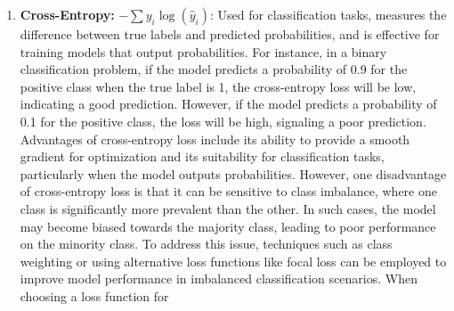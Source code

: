 \documentclass[
  letterpaper,
  DIV=11,
  numbers=noendperiod]{scrreprt}
\begin{document}
\begin{enumerate}
  while its disadvantages include potential challenges in optimization
  due to non-differentiability and slower convergence compared to MSE.
  When choosing between MSE and MAE, it is important to consider the
  specific characteristics of the dataset and the goals of the modeling
  task, as well as the trade-offs between sensitivity to outliers and
  optimization efficiency. There are disadvantages to using MAE, such as
  its non-differentiability at zero, which can lead to challenges in
  optimization using gradient-based methods. This can result in slower
  convergence compared to MSE, especially in cases where the model
  predictions are close to the true values. Additionally, MAE does not
  provide a smooth gradient for optimization, which can make it more
  difficult for certain optimization algorithms to find the optimal
  parameters efficiently. Despite these drawbacks, MAE's robustness to
  outliers can make it a preferable choice in certain regression tasks
  where the presence of outliers is a concern. When choosing between MSE
  and MAE, it is important to consider the specific characteristics of
  the dataset and the goals of the modeling task, as well as the
  trade-offs between sensitivity to outliers and optimization
  efficiency.
\item
  \textbf{Cross-Entropy:} \(-\sum y_i \log(\hat{y}_i)\): Used for
  classification tasks, measures the difference between true labels and
  predicted probabilities, and is effective for training models that
  output probabilities. For instance, in a binary classification
  problem, if the model predicts a probability of 0.9 for the positive
  class when the true label is 1, the cross-entropy loss will be low,
  indicating a good prediction. However, if the model predicts a
  probability of 0.1 for the positive class, the loss will be high,
  signaling a poor prediction. Advantages of cross-entropy loss include
  its ability to provide a smooth gradient for optimization and its
  suitability for classification tasks, particularly when the model
  outputs probabilities. However, one disadvantage of cross-entropy loss
  is that it can be sensitive to class imbalance, where one class is
  significantly more prevalent than the other. In such cases, the model
  may become biased towards the majority class, leading to poor
  performance on the minority class. To address this issue, techniques
  such as class weighting or using alternative loss functions like focal
  loss can be employed to improve model performance in imbalanced
  classification scenarios. When choosing a loss function for

\end{enumerate}
\end{document}
